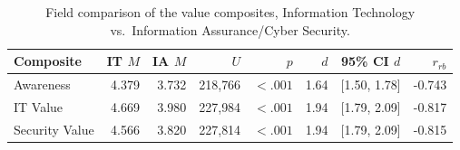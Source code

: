 \begin{table}[ht]
\centering
\caption{Field comparison of the value composites, Information Technology vs.\ Information Assurance/Cyber Security.}
\label{tab:field}
\small
\begin{tabular}{lrrrrrcr}
\toprule
Composite & IT $M$ & IA $M$ & $U$ & $p$ & $d$ & 95\% CI $d$ & $r_{rb}$ \\
\midrule
Awareness & 4.379 & 3.732 & 218{,}766 & $<.001$ & 1.64 & [1.50, 1.78] & -0.743 \\
IT Value & 4.669 & 3.980 & 227{,}984 & $<.001$ & 1.94 & [1.79, 2.09] & -0.817 \\
Security Value & 4.566 & 3.820 & 227{,}814 & $<.001$ & 1.94 & [1.79, 2.09] & -0.815 \\
\bottomrule
\end{tabular}
\end{table}
